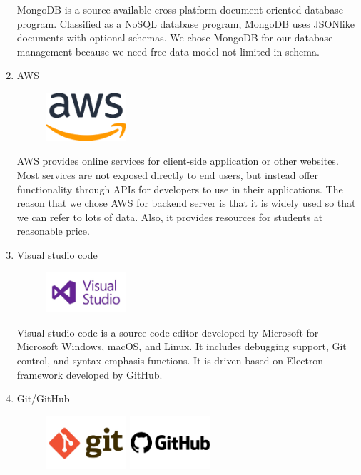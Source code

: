 \documentclass[conference]{IEEEtran}
\begin{document}
\begin{enumerate}
MongoDB is a source-available cross-platform document-oriented database program. Classified as a NoSQL database program, MongoDB uses JSONlike documents with optional schemas. We chose MongoDB for our database management because we need free data model not limited in schema.

\item AWS
\par \begin{figure}[h!]
\includegraphics[width=3cm]{image/AWS.png}
\centering
\end{figure}

AWS provides online services for client-side application or other websites. Most services are not exposed directly to end users, but instead offer functionality through APIs for developers to use in their applications. The reason that we chose AWS for backend server is that it is widely used so that we can refer to lots of data. Also, it provides resources for students at reasonable price.

\item Visual studio code
\par \begin{figure}[h!]
\includegraphics[width=3cm]{image/Visual studio code.jpeg}
\centering
\end{figure}

Visual studio code is a source code editor developed by Microsoft for Microsoft Windows, macOS, and Linux. It includes debugging support, Git control, and syntax emphasis functions. It is driven based on Electron framework developed by GitHub.

\item Git/GitHub
\par \begin{figure}[h!]
\includegraphics[width=3cm]{image/Git.jpg}
\includegraphics[width=3cm]{image/GitHub.png}
\centering
\end{figure}


\end{enumerate}
\end{document}

